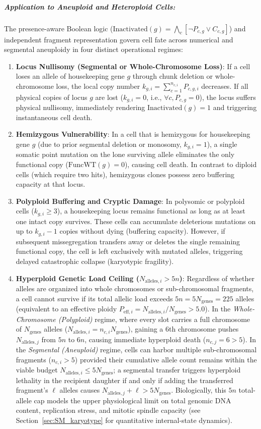 \documentclass[11pt,a4paper]{article}
\begin{document}
\subparagraph{Application to Aneuploid and Heteroploid Cells:}
The presence-aware Boolean logic ($\text{Inactivated}(g) = \bigwedge_{c} [\neg P_{c,g} \lor C_{c,g}]$) and independent fragment representation govern cell fate across numerical and segmental aneuploidy in four distinct operational regimes:
\begin{enumerate}
    \item \textbf{Locus Nullisomy (Segmental or Whole-Chromosome Loss)}: If a cell loses an allele of housekeeping gene $g$ through chunk deletion or whole-chromosome loss, the local copy number $k_{g, i} = \sum_{c=1}^{n_{c, i}} P_{c, g, i}$ decreases. If all physical copies of locus $g$ are lost ($k_{g, i} = 0$, i.e., $\forall c, P_{c,g} = 0$), the locus suffers physical nullisomy, immediately rendering $\text{Inactivated}(g) = 1$ and triggering instantaneous cell death.
    \item \textbf{Hemizygous Vulnerability}: In a cell that is hemizygous for housekeeping gene $g$ (due to prior segmental deletion or monosomy, $k_{g, i} = 1$), a single somatic point mutation on the lone surviving allele eliminates the only functional copy ($\text{FuncWT}(g) = 0$), causing cell death. In contrast to diploid cells (which require two hits), hemizygous clones possess zero buffering capacity at that locus.
    \item \textbf{Polyploid Buffering and Cryptic Damage}: In polysomic or polyploid cells ($k_{g, i} \ge 3$), a housekeeping locus remains functional as long as at least one intact copy survives. These cells can accumulate deleterious mutations on up to $k_{g, i} - 1$ copies without dying (buffering capacity). However, if subsequent missegregation transfers away or deletes the single remaining functional copy, the cell is left exclusively with mutated alleles, triggering delayed catastrophic collapse (karyotypic fragility).
    \item \textbf{Hyperploid Genetic Load Ceiling ($N_{\text{alleles}, i} > 5n$)}: Regardless of whether alleles are organized into whole chromosomes or sub-chromosomal fragments, a cell cannot survive if its total allelic load exceeds $5n = 5 N_{\text{genes}} = 225$ alleles (equivalent to an effective ploidy $P_{\text{eff}, i} = N_{\text{alleles}, i} / N_{\text{genes}} > 5.0$). In the \emph{Whole-Chromosome (Polyploid)} regime, where every slot carries a full chromosome of $N_{\text{genes}}$ alleles ($N_{\text{alleles}, i} = n_{c, i} N_{\text{genes}}$), gaining a 6th chromosome pushes $N_{\text{alleles}, j}$ from $5n$ to $6n$, causing immediate hyperploid death ($n_{c, j} = 6 > 5$). In the \emph{Segmental (Aneuploid)} regime, cells can harbor multiple sub-chromosomal fragments ($n_{c, i} > 5$) provided their cumulative allele count remains within the viable budget $N_{\text{alleles}, i} \le 5 N_{\text{genes}}$; a segmental transfer triggers hyperploid lethality in the recipient daughter if and only if adding the transferred fragment's $\ell$ alleles causes $N_{\text{alleles}, j} + \ell > 5 N_{\text{genes}}$. Biologically, this $5n$ total-allele cap models the upper physiological limit on total genomic DNA content, replication stress, and mitotic spindle capacity (see Section~\ref{sec:SM_karyotype} for quantitative internal-state dynamics).
\end{enumerate}
\end{document}
